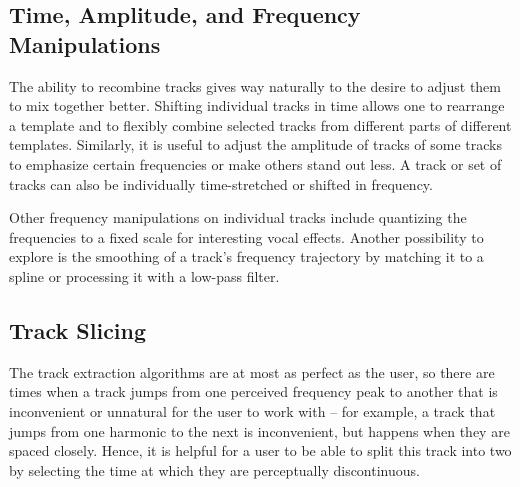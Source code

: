 \documentclass{article}
\begin{document}
\subsection{Time, Amplitude, and Frequency Manipulations}

The ability to recombine tracks gives way naturally to the desire to adjust them
to mix together better. Shifting individual tracks in time allows one to rearrange 
a template and to flexibly combine selected tracks from different parts of different 
templates. Similarly, it is useful to adjust the amplitude of tracks 
of some tracks to emphasize certain frequencies or make others stand out less. 
A track or set of tracks can also be individually time-stretched or shifted in frequency.

Other frequency manipulations on individual tracks include quantizing 
the frequencies to a fixed scale for interesting vocal effects. Another possibility 
to explore is the smoothing of a track's frequency trajectory by matching it to a spline 
or processing it with a low-pass filter. 
 

\subsection{Track Slicing}

The track extraction algorithms are at most as perfect as the user, so there
are times when a track jumps from one perceived frequency peak to another that
is inconvenient or unnatural for the user to work with -- for example, a track
that jumps from one harmonic to the next is inconvenient, but happens when they
are spaced closely.  Hence, it is helpful for a user to be able to split this track into two by
selecting the time at which they are perceptually discontinuous.
\end{document}
